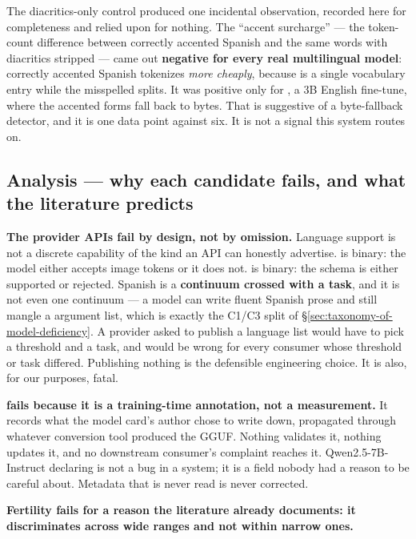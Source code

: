 The diacritics-only control produced one incidental observation, recorded here
for completeness and relied upon for nothing. The ``accent surcharge'' --- the
token-count difference between correctly accented Spanish and the same words
with diacritics stripped --- came out \textbf{negative for every real
multilingual model}: correctly accented Spanish tokenizes \emph{more cheaply},
because  is a single vocabulary entry while the misspelled
 splits. It was positive only for , a 3B English
fine-tune, where the accented forms fall back to bytes. That is suggestive of a
byte-fallback detector, and it is one data point against six. It is not a signal
this system routes on.

\subsection{Analysis --- why each candidate fails, and what the literature
predicts}
\label{sec:appendix-analysis}

\textbf{The provider APIs fail by design, not by omission.} Language support is
not a discrete capability of the kind an API can honestly advertise.
 is binary: the model either accepts image tokens or it does not.
 is binary: the schema is either supported or rejected. Spanish is a
\textbf{continuum crossed with a task}, and it is not even one continuum --- a
model can write fluent Spanish prose and still mangle a
 argument list, which is exactly the C1/C3 split of
\S\ref{sec:taxonomy-of-model-deficiency}. A provider asked to publish a language
list would have to pick a threshold and a task, and would be wrong for every
consumer whose threshold or task differed. Publishing nothing is the defensible
engineering choice. It is also, for our purposes, fatal.

\textbf{ fails because it is a training-time annotation,
not a measurement.} It records what the model card's author chose to write down,
propagated through whatever conversion tool produced the GGUF. Nothing validates
it, nothing updates it, and no downstream consumer's complaint reaches it.
Qwen2.5-7B-Instruct declaring \code{["en"]} is not a bug in a system; it is a
field nobody had a reason to be careful about. Metadata that is never read is
never corrected.

\textbf{Fertility fails for a reason the literature already documents: it
discriminates across wide ranges and not within narrow ones.}

